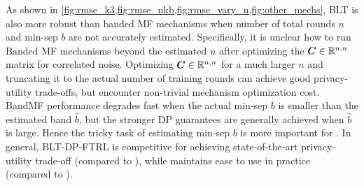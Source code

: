 As shown in \cref{fig:rmse_k3,fig:rmse_nkb,fig:rmse_vary_n,fig:other_mechs}, BLT is also more robust than banded MF mechanisms when number of total rounds $n$ and min-sep $b$ are not accurately estimated. Specifically, it is unclear how to run Banded MF mechanisms beyond the estimated $n$ after optimizing the ${\bm{C}} \in \mathbb{R}^{n, n}$ matrix for correlated noise. Optimizing ${\bm{C}} \in \mathbb{R}^{n, n}$ for a much larger $n$ and truncating it to the actual number of training rounds can achieve good privacy-utility trade-offs, but encounter non-trivial mechanism optimization cost. BandMF performance degrades fast when the actual min-sep $b$ is smaller than the estimated band $\hat b$, but the stronger DP guarantees are generally achieved when $\hat b$ is large. Hence the tricky task of estimating min-sep $b$ is more important for \bandmf. In general, BLT-DP-FTRL is competitive for achieving state-of-the-art privacy-utility trade-off (compared to \bandmf), while maintains ease to use in practice (compared to \treeagg).  